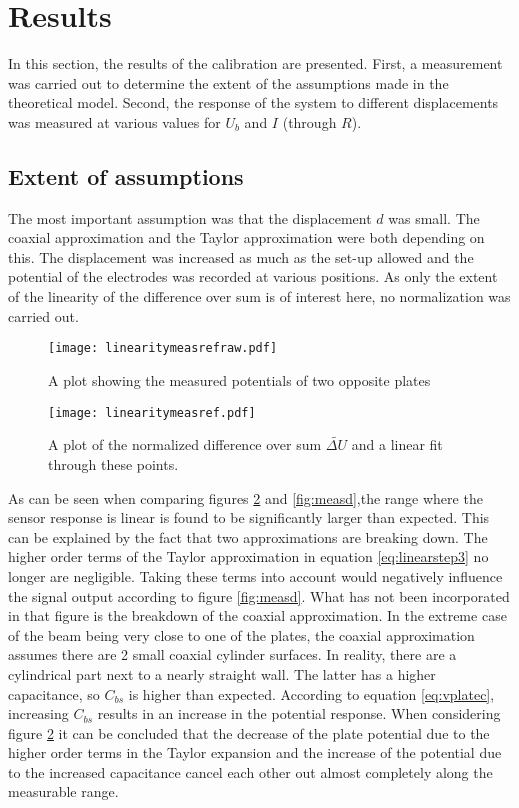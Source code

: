 \section{Results}
In this section, the results of the calibration are presented. First, a measurement was carried out to determine the extent of the assumptions made in the theoretical model. Second, the response of the system to different displacements was measured at various values for $U_b$ and $I$ (through $R$).

\subsection{Extent of assumptions}
The most important assumption was that the displacement $d$ was small. The coaxial approximation and the Taylor approximation were both depending on this. The displacement was increased as much as the set-up allowed and the potential of the electrodes was recorded at various positions. As only the extent of the linearity of the difference over sum is of interest here, no normalization was carried out.
\begin{figure}[h]
\centering
\texttt{[image: linearitymeasrefraw.pdf]}
\caption{A plot showing the measured potentials of two opposite plates}
\label{fig:linearitymeasraw}
\end{figure}

\begin{figure}[h]
\centering
\texttt{[image: linearitymeasref.pdf]}
\caption{A plot of the normalized difference over sum $\widetilde{\Delta U}$ and a linear fit through these points.}
\label{fig:linearitymeas}
\end{figure}

As can be seen when comparing figures \ref{fig:linearitymeas} and \ref{fig:measd},the range where the sensor response is linear is found to be significantly larger than expected. This can be explained by the fact that two approximations are breaking down. The higher order terms of the Taylor approximation in equation \ref{eq:linearstep3} no longer are negligible. Taking these terms into account would negatively influence the signal output according to figure \ref{fig:measd}. What has not been incorporated in that figure is the breakdown of the coaxial approximation. In the extreme case of the beam being very close to one of the plates, the coaxial approximation assumes there are 2 small coaxial cylinder surfaces. In reality, there are a cylindrical part next to a nearly straight wall. The latter has a higher capacitance, so $C_{bs}$ is higher than expected. According to equation \ref{eq:vplatec}, increasing $C_{bs}$ results in an increase in the potential response. When considering figure \ref{fig:linearitymeas} it can be concluded that the decrease of the plate potential due to the higher order terms in the Taylor expansion and the increase of the potential due to the increased capacitance cancel each other out almost completely along the measurable range.

